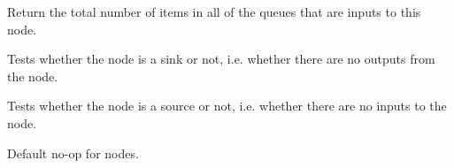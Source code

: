 \documentclass[letterpaper,10pt,english]{sphinxmanual}
\begin{document}
\begin{fulllineitems}
\begin{fulllineitems}
\end{fulllineitems}


\begin{fulllineitems}
\label{\detokenize{api:nanostream.node.NanoNode.input_queue_size}}
Return the total number of items in all of the queues that are inputs
to this node.

\end{fulllineitems}


\begin{fulllineitems}
\label{\detokenize{api:nanostream.node.NanoNode.is_sink}}
Tests whether the node is a sink or not, i.e. whether there are no
outputs from the node.

\end{fulllineitems}


\begin{fulllineitems}
\label{\detokenize{api:nanostream.node.NanoNode.is_source}}
Tests whether the node is a source or not, i.e. whether there are no
inputs to the node.

\end{fulllineitems}


\begin{fulllineitems}
\label{\detokenize{api:nanostream.node.NanoNode.kill_pipeline}}
\end{fulllineitems}


\begin{fulllineitems}
\label{\detokenize{api:nanostream.node.NanoNode.log_info}}
\end{fulllineitems}


\begin{fulllineitems}
\label{\detokenize{api:nanostream.node.NanoNode.process_item}}
Default no-op for nodes.


\end{fulllineitems}
\end{fulllineitems}
\end{document}

